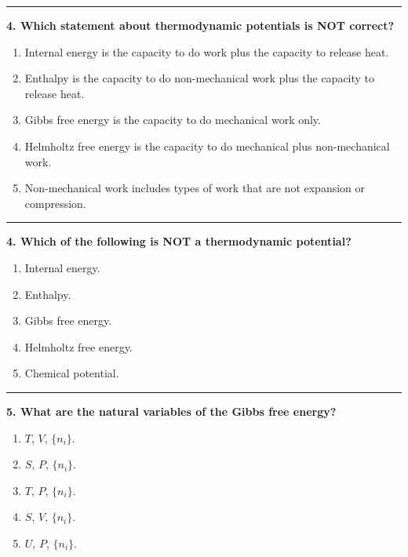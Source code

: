 \documentclass[
  9pt,
]{extbook}
\providecommand{\tightlist}{%
  \setlength{\itemsep}{0pt}\setlength{\parskip}{0pt}}
\theoremstyle{definition}
\theoremstyle{definition}
\theoremstyle{definition}
\theoremstyle{remark}
\begin{document}
\begin{center}\rule{0.5\linewidth}{0.5pt}\end{center}

\textbf{4. Which statement about thermodynamic potentials is NOT correct?}

\begin{enumerate}
\def\labelenumi{\alph{enumi}.}
\tightlist
\item
  Internal energy is the capacity to do work plus the capacity to release heat.
\item
  Enthalpy is the capacity to do non-mechanical work plus the capacity to release heat.
\item
  Gibbs free energy is the capacity to do mechanical work only.
\item
  Helmholtz free energy is the capacity to do mechanical plus non-mechanical work.
\item
  Non-mechanical work includes types of work that are not expansion or compression.
\end{enumerate}

\begin{center}\rule{0.5\linewidth}{0.5pt}\end{center}

\textbf{4. Which of the following is NOT a thermodynamic potential?}

\begin{enumerate}
\def\labelenumi{\alph{enumi}.}
\tightlist
\item
  Internal energy.
\item
  Enthalpy.
\item
  Gibbs free energy.
\item
  Helmholtz free energy.
\item
  Chemical potential.
\end{enumerate}

\begin{center}\rule{0.5\linewidth}{0.5pt}\end{center}

\textbf{5. What are the natural variables of the Gibbs free energy?}

\begin{enumerate}
\def\labelenumi{\alph{enumi}.}
\tightlist
\item
  \(T\), \(V\), \(\{n_i\}\).
\item
  \(S\), \(P\), \(\{n_i\}\).
\item
  \(T\), \(P\), \(\{n_i\}\).
\item
  \(S\), \(V\), \(\{n_i\}\).
\item
  \(U\), \(P\), \(\{n_i\}\).
\end{enumerate}
\end{document}
